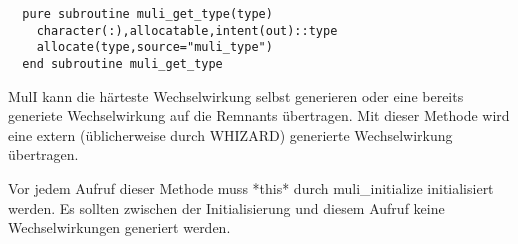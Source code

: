 \begin{Verbatim}
  pure subroutine muli_get_type(type)
    character(:),allocatable,intent(out)::type
    allocate(type,source="muli_type")
  end subroutine muli_get_type
\end{Verbatim}

MulI kann die härteste Wechselwirkung selbst generieren oder eine bereits generiete Wechselwirkung auf die Remnants übertragen. Mit dieser Methode wird eine extern (üblicherweise durch WHIZARD) generierte Wechselwirkung übertragen.

Vor jedem Aufruf dieser Methode muss *this* durch muli\_initialize initialisiert werden. Es sollten zwischen der Initialisierung und diesem Aufruf keine Wechselwirkungen generiert werden.

